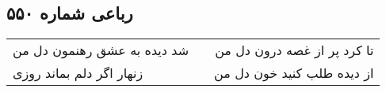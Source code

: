 \begin{center}
\section*{رباعی شماره ۵۵۰}
\label{sec:sh550}
\begin{longtable}{l p{0.5cm} r}
شد دیده به عشق رهنمون دل من
&&
تا کرد پر از غصه درون دل من
\\
زنهار اگر دلم بماند روزی
&&
از دیده طلب کنید خون دل من
\\
\end{longtable}
\end{center}
